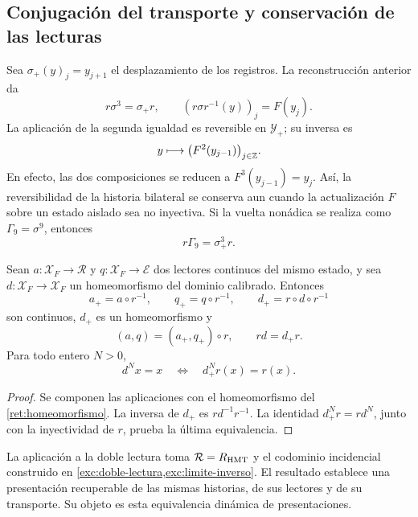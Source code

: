 \subsection{Conjugación del transporte y conservación de las lecturas}

Sea \(\sigma_+(y)_j=y_{j+1}\) el desplazamiento de los registros.
La reconstrucción anterior da
\begin{equation}
 r\sigma^3=\sigma_+r,\qquad
 (r\sigma r^{-1}(y))_j=F(y_j).
 \label{ret:conjugacion}
\end{equation}
La aplicación de la segunda igualdad es reversible en
\(\mathscr Y_+\); su inversa es
\[
 y\longmapsto\bigl(F^2(y_{j-1})\bigr)_{j\in\mathbb Z}.
\]
En efecto, las dos composiciones se reducen a
\(F^3(y_{j-1})=y_j\).
Así, la reversibilidad de la historia bilateral se conserva aun
cuando la actualización \(F\) sobre un estado aislado sea no inyectiva.
Si la vuelta nonádica se realiza como \(\Gamma_9=\sigma^9\), entonces
\begin{equation}
 r\Gamma_9=\sigma_+^3r.
 \label{ret:vuelta-nonadica}
\end{equation}

\begin{corollary}
\label{ret:lecturas}
Sean \(a:\mathscr X_F\to\mathcal R\) y
\(q:\mathscr X_F\to\mathcal E\) dos lectores continuos del mismo
estado, y sea \(d:\mathscr X_F\to\mathscr X_F\) un homeomorfismo del
dominio calibrado. Entonces
\[
 a_+=a\circ r^{-1},\qquad
 q_+=q\circ r^{-1},\qquad
 d_+=r\circ d\circ r^{-1}
\]
son continuos, \(d_+\) es un homeomorfismo y
\begin{equation}
 (a,q)=(a_+,q_+)\circ r,\qquad rd=d_+r.
 \label{ret:factorizacion}
\end{equation}
Para todo entero \(N>0\),
\[
 d^Nx=x\quad\Longleftrightarrow\quad d_+^Nr(x)=r(x).
\]
\end{corollary}
\begin{proof}
Se componen las aplicaciones con el homeomorfismo del
\cref{ret:homeomorfismo}. La inversa de \(d_+\) es
\(rd^{-1}r^{-1}\). La identidad
\(d_+^Nr=rd^N\), junto con la inyectividad de \(r\), prueba la
última equivalencia.
\end{proof}

La aplicación a la doble lectura toma
\(\mathcal R=R_{\rm HMT}\) y el codominio incidencial construido en
\cref{exc:doble-lectura,exc:limite-inverso}.
El resultado establece una presentación recuperable de las mismas
historias, de sus lectores y de su transporte. Su objeto es esta
equivalencia dinámica de presentaciones.
